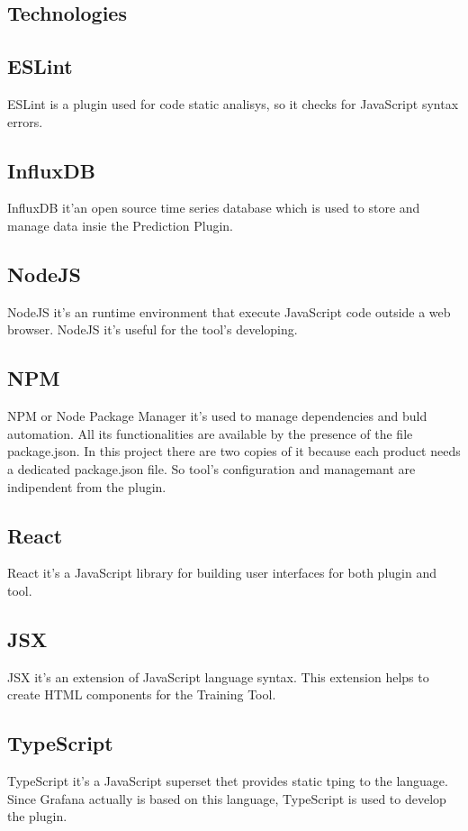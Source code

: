 \subsection{Technologies}
\subsection{ESLint}
ESLint is a plugin used for code static analisys, so it checks for JavaScript syntax errors.

\subsection{InfluxDB}
InfluxDB it'an open source time series database which is used to store and manage data insie the Prediction Plugin. 

\subsection{NodeJS}
NodeJS it's an runtime environment that execute JavaScript code outside a web browser. NodeJS it's useful for the tool's developing.

\subsection{NPM}
NPM or Node Package Manager it's used to manage dependencies and buld automation. All its functionalities are available by the presence of the file package.json. In this project there are two copies of it because each product needs a dedicated package.json file. So tool's configuration and managemant are indipendent from the plugin.

\subsection{React}
React it's a JavaScript library for building user interfaces for both plugin and tool.

\subsection{JSX}
JSX it's an extension of JavaScript language syntax. This extension helps to create HTML components for the Training Tool.

\subsection{TypeScript}
TypeScript it's a JavaScript superset thet provides static tping to the language. Since Grafana actually is based on this language, TypeScript is used to develop the plugin.

